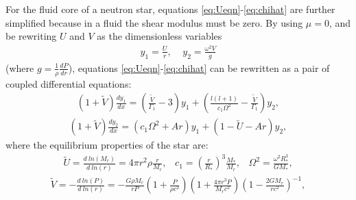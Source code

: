 \documentclass[fleqn,usenatbib]{mnras}
\begin{document}
\hspace{\parindent}For the fluid core of a neutron star, equations \ref{eq:Ueqn}-\ref{eq:chihat} are further simplified because in a fluid the shear modulus must be zero. By using $\mu=0$, and be rewriting $U$ and $V$ as the dimensionless variables
\begin{align}
y_1=\frac{U}{r},\;\;\;\;y_2=\frac{\omega^2V}{g}
\label{eq:y1y2}
\end{align}
\noindent (where $g=\frac{1}{\rho}\frac{dP}{dr}$), equations \ref{eq:Ueqn}-\ref{eq:chihat} can be rewritten as a pair of coupled differential equations:
\begin{align}
\left(1+\tilde{V}\right)\frac{dy_1}{dx}=\left(\frac{\tilde{V}}{\Gamma_1}-3\right)y_1+\left(\frac{l(l+1)}{c_1\Omega^2}-\frac{\tilde{V}}{\Gamma_1}\right)y_2,
\label{eq:McDy1}
\end{align}
\begin{align}
\left(1+\tilde{V}\right)\frac{dy_2}{dx}=\left(c_1\Omega^2+Ar\right)y_1+\left(1-\tilde{U}-Ar\right)y_2,
\label{eq:McDy2}
\end{align}
\noindent where the equilibrium properties of the star are: 
\begin{align}\nonumber
\tilde{U}=\frac{d\:ln\left(M_r\right)}{d\:ln\left(r\right)}=4\pi r^2\rho\frac{r}{M_r},\;\;\;c_1=\left(\frac{r}{R_*}\right)^3\frac{M_*}{M_r},\;\;\;\Omega^2=\frac{\omega^2R_*^3}{GM_*},
\end{align}
\begin{align}\nonumber
\tilde{V}=-\frac{d\:ln\left(P\right)}{d\:ln\left(r\right)}=-\frac{G\rho M_r}{rP}\left(1+\frac{P}{\rho c^2}\right)\left(1+\frac{4\pi r^3 P}{M_r c^2}\right)\left(1-\frac{2GM_r}{rc^2}\right)^{-1},
\end{align}
\end{document}
